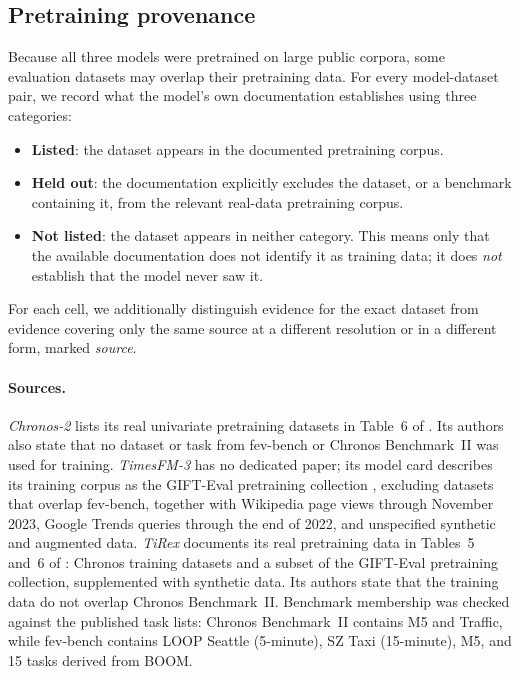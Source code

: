 \documentclass{article} %
\begin{document}
\subsection{Pretraining provenance}
\label{app:provenance}

Because all three models were pretrained on large public corpora, some evaluation datasets may
overlap their pretraining data. For every model-dataset pair, we record what the model's own
documentation establishes using three categories:
\begin{itemize}[leftmargin=*]
  \item \textbf{Listed}: the dataset appears in the documented pretraining corpus.
  \item \textbf{Held out}: the documentation explicitly excludes the dataset, or a benchmark
  containing it, from the relevant real-data pretraining corpus.
  \item \textbf{Not listed}: the dataset appears in neither category. This means only that the
  available documentation does not identify it as training data; it does \emph{not} establish
  that the model never saw it.
\end{itemize}
For each cell, we additionally distinguish evidence for the exact dataset from evidence covering
only the same source at a different resolution or in a different form, marked \emph{source}.

\paragraph{Sources.}
\emph{Chronos-2} lists its real univariate pretraining datasets in Table~6 of
\citet{ansari2025chronos2univariateuniversalforecasting}. Its authors also state that no dataset or task from fev-bench \citep{shchur2026fevbenchrealisticbenchmarktime} or Chronos Benchmark~II
\citep{ansari2024chronoslearninglanguagetime} was used for training.
\emph{TimesFM-3} has no dedicated paper; its model card describes its training corpus as the
GIFT-Eval pretraining collection \citep{aksu2024giftevalbenchmarkgeneraltime}, excluding
datasets that overlap fev-bench, together with Wikipedia page views through November 2023,
Google Trends queries through the end of 2022, and unspecified synthetic and augmented data.
\emph{TiRex} documents its real pretraining data in Tables~5 and~6 of
\citet{auer2025tirexzeroshotforecastinglong}: Chronos training datasets and a subset of the
GIFT-Eval pretraining collection, supplemented with synthetic data. Its authors state that the
training data do not overlap Chronos Benchmark~II. Benchmark membership was checked against
the published task lists: Chronos Benchmark~II contains M5 and Traffic, while fev-bench
contains LOOP Seattle (5-minute), SZ Taxi (15-minute), M5, and 15 tasks derived from BOOM.
\end{document}
